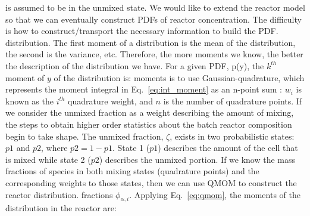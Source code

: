 %
%
is assumed to be in the unmixed state. We would like to extend the reactor model so that we can eventually construct PDFs of
reactor concentration. The difficulty is how to construct/transport the necessary information to build the PDF.
%
distribution. The first moment of a distribution is the mean of the distribution, the second is the variance, etc. Therefore, the
more moments we know, the better the description of the distribution we have. For a given PDF, p(y), the $k^{th}$ moment of $y$ of
the distribution is:
moments is to use Gaussian-quadrature, which represents the moment integral in Eq.~\ref{eq:int_moment} as an n-point sum
\cite{mcgraw:1997}:
$w_i$ is known as the $i^{th}$ quadrature weight, and $n$ is the number of quadrature points. If we consider the unmixed fraction
as a weight describing the amount of mixing, the steps to obtain higher order statistics about the batch reactor composition begin
to take shape. The unmixed fraction, $\zeta$, exists in two probabilistic states: $p1$ and $p2$, where $p2 = 1-p1$. State 1 ($p1$)
describes the amount of the cell that is mixed while state 2 ($p2$) describes the unmixed portion. If we know the mass fractions
of species in both mixing states (quadrature points) and the corresponding weights to those states, then we can use QMOM to
construct the reactor distribution.
%
fractions $\phi_{\alpha,i}$. Applying Eq.~\ref{eq:qmom}, the moments of the distribution in the reactor are:
